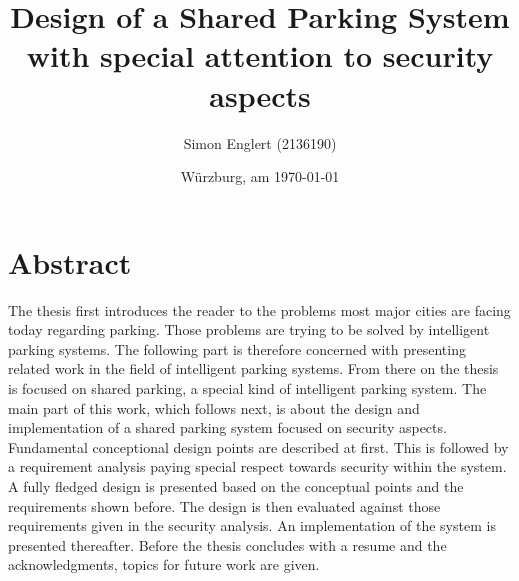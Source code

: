 \documentclass[
a4paper,     %
titlepage,   %
14pt         %
]{scrartcl}  %
\title{Design of a Shared Parking System with special attention to security aspects}
\author{Simon Englert (2136190)}
\date{Würzburg, am \today{}}
\theoremstyle{mystyle}
\begin{document}

 \maketitle

 \tableofcontents



 \newpage



\section{Abstract}
The thesis first introduces the reader to the problems most major cities are facing today regarding parking. Those problems are trying to be solved by intelligent parking systems. The following part is therefore concerned with presenting related work in the field of intelligent parking systems. From there on the thesis is focused on shared parking, a special kind of intelligent parking system. The main part of this work, which follows next, is about the design and implementation of a shared parking system focused on security aspects. Fundamental conceptional design points are described at first. This is followed by a requirement analysis paying special respect towards security within the system. A fully fledged design is presented based on the conceptual points and the requirements shown before. The design is then evaluated against those requirements given in the security analysis. An implementation of the system is presented thereafter. Before the thesis concludes with a resume and the acknowledgments, topics for future work are given.
\end{document}
